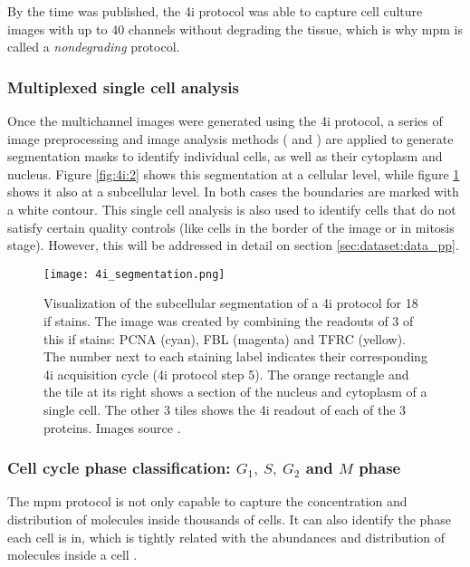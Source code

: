 By the time \cite{Guteaar7042} was published, the \gls{4i} protocol was able to capture cell culture images with up to 40 channels without degrading the tissue, which is why \gls{mpm} is called a \textit{nondegrading} protocol.

\subsubsection{Multiplexed single cell analysis}

Once the multichannel images were generated using the \gls{4i} protocol, a series of image preprocessing and image analysis methods (\cite{Carpenter2006} and \cite{snijder2012single}) are applied to generate segmentation masks to identify individual cells, as well as their cytoplasm and nucleus. Figure \ref{fig:4i:2} shows this segmentation at a cellular level, while figure \ref{fig:4i:segmentation} shows it also at a subcellular level. In both cases the boundaries are marked with a white contour. This single cell analysis is also used to identify cells that do not satisfy certain quality controls (like cells in the border of the image or in mitosis stage). However, this will be addressed in detail on section \ref{sec:dataset:data_pp}.

\begin{figure}[htb]
  \centering
  \texttt{[image: 4i\_segmentation.png]}
  \caption{Visualization of the subcellular segmentation of a \gls{4i} protocol for 18 \gls{if} stains. The image was created by combining the readouts of 3 of this \gls{if} stains: PCNA (cyan), FBL (magenta) and TFRC (yellow). The number next to each staining label indicates their corresponding 4i acquisition cycle (\gls{4i} protocol step 5). The orange rectangle and the tile at its right shows a section of the nucleus and cytoplasm of a single cell. The other 3 tiles shows the \gls{4i} readout of each of the 3 proteins. Images source \cite{Guteaar7042}.}
  \label{fig:4i:segmentation}
\end{figure}

\subsubsection{Cell cycle phase classification: $G_1,\ S,\ G_2$ and $M$ phase}

The \gls{mpm} protocol is not only capable to capture the concentration and distribution of molecules inside thousands of cells. It can also identify the phase each cell is in, which is tightly related with the abundances and distribution of molecules inside a cell \cite{Guteaar7042}.

